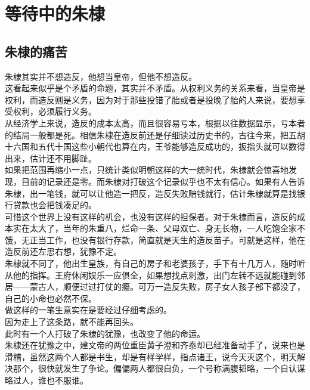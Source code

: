 \section{等待中的朱棣}
\ifnum{}
	\begin{multicols}{\theparacolNo}
\fi
\subsection{朱棣的痛苦}
朱棣其实并不想造反，他想当皇帝，但他不想造反。\\

这看起来似乎是个矛盾的命题，其实并不矛盾。从权利义务的关系来看，当皇帝是权利，而造反则是义务，因为对于那些投错了胎或者是投晚了胎的人来说，要想享受权利，必须履行义务。\\

从经济学上来说，造反的成本太高，而且很容易亏本，根据以往数据显示，亏本者的结局一般都是死。相信朱棣在造反前还是仔细读过历史书的，古往今来，把五胡十六国和五代十国这些小朝代也算在内，王爷能够造反成功的，扳指头就可以数得出来，估计还不用脚趾。\\

如果把范围再缩小一点，只统计类似明朝这样的大一统时代，朱棣就会惊喜地发现，目前的记录还是零。而朱棣对打破这个记录似乎也不太有信心。如果有人告诉朱棣，出一笔钱，就可以让他造一把反，造反失败赔钱就行，估计朱棣就算是找银行贷款也会把钱凑足的。\\

可惜这个世界上没有这样的机会，也没有这样的担保者。对于朱棣而言，造反的成本实在太大了，当年的朱重八，烂命一条、父母双亡、身无长物，一人吃饱全家不饿，无正当工作，也没有银行存款，简直就是天生的造反苗子。可就是这样，他在造反前还左思右想，犹豫不定。\\

朱棣就不同了，他出生皇族，有自己的房子和老婆孩子，手下有十几万人，随时听从他的指挥。王府休闲娱乐一应俱全，如果想找点刺激，出门左转不远就能碰到邻居——蒙古人，顺便过过打仗的瘾。可万一造反失败，房子女人孩子部下都没了，自己的小命也必然不保。\\

做这样的一笔生意实在是要经过仔细考虑的。\\

因为走上了这条路，就不能再回头。\\

此时有一个人打破了朱棣的犹豫，也改变了他的命运。\\

朱棣还在犹豫之中，建文帝的两位重臣黄子澄和齐泰却已经准备动手了，说来也是滑稽，虽然这两个人都是书生，却是有样学样，指点诸王，说今天灭这个，明天解决那个，很快就发生了争论。偏偏两人都很自负，一个号称满腹韬略，一个自认谋略过人，谁也不服谁。\\


\end{multicols}
